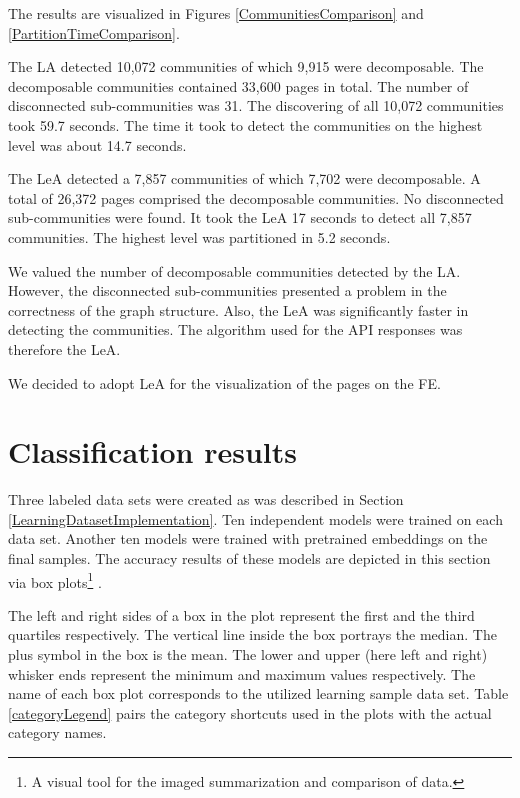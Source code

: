 The results are visualized in Figures \ref{CommunitiesComparison} and \ref{PartitionTimeComparison}. 

The LA detected 10,072 communities of which 9,915 were decomposable. The decomposable communities contained 33,600 pages in total. The number of disconnected sub-communities was 31. The discovering of all 10,072 communities took 59.7 seconds. The time it took to detect the communities on the highest level was about 14.7 seconds. 

The LeA detected a 7,857 communities of which 7,702 were decomposable. A total of 26,372 pages comprised the decomposable communities. No disconnected sub-communities were found. It took the LeA 17 seconds to detect all 7,857 communities. The highest level was partitioned in 5.2 seconds. 

We valued the number of decomposable communities detected by the LA. However, the disconnected sub-communities presented a problem in the correctness of the graph structure. Also, the LeA was significantly faster in detecting the communities. The algorithm used for the API responses was therefore the LeA. 

We decided to adopt LeA for the visualization of the pages on the FE. 

\section{Classification results}\label{classificationEvaluation}
Three labeled data sets were created as was described in Section \ref{LearningDatasetImplementation}. Ten independent models were trained on each data set. Another ten models were trained with pretrained embeddings on the final samples. The accuracy results of these models are depicted in this section via box plots\footnote{A visual tool for the imaged summarization and comparison of data.} \cite{boxplot}. 

The left and right sides of a box in the plot represent the first and the third quartiles respectively. The vertical line inside the box portrays the median. The plus symbol in the box is the mean. The lower and upper (here left and right) whisker ends represent the minimum and maximum values respectively. The name of each box plot corresponds to the utilized learning sample data set. Table \ref{categoryLegend} pairs the category shortcuts used in the plots with the actual category names. 


